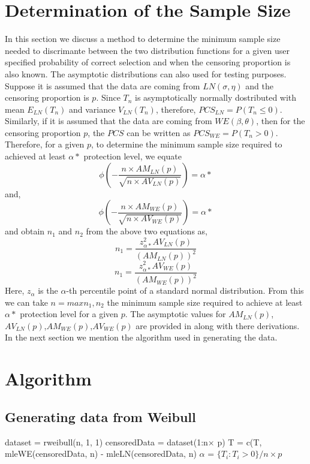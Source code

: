 \documentclass[twoside]{article}
\begin{document}
\begin{multicols}{2}
\section{Determination of the Sample Size}
 In this section we discuss a method to determine the minimum sample size needed to discrimante between the two distribution functions for a given user specified probability of correct selection and when the censoring proportion is also known. The asymptotic distributions can also used for testing purposes.
 Suppose it is assumed that the data are coming from $LN(\sigma,\eta)$ and the censoring proportion is $p$. Since $T_n$ is asymptotically normally dostributed with mean $E_{LN}(T_n)$ and variance $V_{LN}(T_n)$, therefore, $PCS_{LN}=P(T_{n}\leq 0)$. Similarly, if it is assumed that the data are coming from $WE(\beta,\theta)$, then for the censoring proportion $p$, the $PCS$ can be written as $PCS_{WE}=P(T_{n}>0)$. Therefore, for a given $p$, to determine the minimum sample size required to achieved at least $\alpha*$ protection level, we equate
\begin{equation}
\phi\left(-\frac{n\times AM_{LN}(p)}{\sqrt{n\times AV_{LN}(p)}}\right)=\alpha*
\end{equation}
 and,
\begin{equation}
\phi\left(-\frac{n\times AM_{WE}(p)}{\sqrt{n\times AV_{WE}(p)}}\right)=\alpha*
\end{equation}
and obtain $n_1$ and $n_2$ from the above two equations as,
\begin{equation}
n_1=\frac{z_{\alpha*}^{2}AV_{LN}(p)}{(AM_{LN}(p))^2}
\end{equation}
\begin{equation}
n_1=\frac{z_{\alpha*}^{2}AV_{WE}(p)}{(AM_{WE}(p))^2}
\end{equation} 
Here, $z_\alpha$ is the $\alpha$-th percentile point of a standard normal distribution. From this we can take $n=max{n_1,n_2}$ the minimum sample size required to achieve at least $\alpha*$ protection level for a given $p$. The asymptotic values for $AM_{LN}(p)$,$AV_{LN}(p)$,$AM_{WE}(p)$,$AV_{WE}(p)$ are provided in \cite{ad09} along with there derivations. In the next section we mention the algorithm used in generating the data. 
\section{Algorithm}
\subsection{Generating data from Weibull}
\begin{algorithm}[H]
  dataset = rweibull(n, 1, 1)\;
  censoredData = dataset(1:n$\times$ p)\;
  T = c(T, mleWE(censoredData, n) - mleLN(censoredData, n)\;
  $\alpha$ = $\{T_i : T_i > 0\}/n\times p$\;
\end{algorithm}



\end{multicols}
\end{document}
